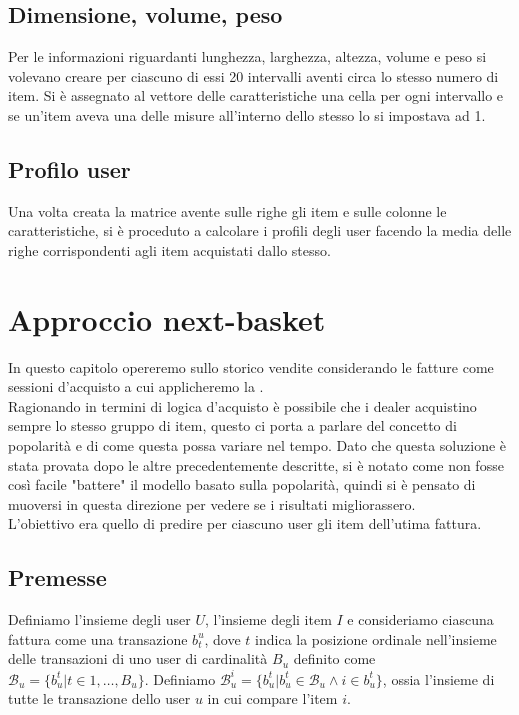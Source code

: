\subsection{Dimensione, volume, peso}
Per le informazioni riguardanti lunghezza, larghezza, altezza, volume e peso si volevano creare per ciascuno di essi 20 intervalli aventi circa lo stesso numero di item. Si è assegnato al vettore delle caratteristiche una cella per ogni intervallo e se un'item aveva una delle misure all'interno dello stesso lo si impostava ad 1.

\subsection{Profilo user}
Una volta creata la matrice avente sulle righe gli item e sulle colonne le caratteristiche, si è proceduto a calcolare i profili degli user facendo la media delle righe corrispondenti agli item acquistati dallo stesso.

\section{Approccio next-basket}
In questo capitolo opereremo sullo storico vendite considerando le fatture come sessioni d'acquisto a cui applicheremo la .\\
Ragionando in termini di logica d'acquisto è possibile che i dealer acquistino sempre lo stesso gruppo di item, questo ci porta a parlare del concetto di popolarità e di come questa possa variare nel tempo.
Dato che questa soluzione è stata provata dopo le altre precedentemente descritte, si è notato come non fosse così facile "battere" il modello basato sulla popolarità, quindi si è pensato di muoversi in questa direzione per vedere se i risultati migliorassero.\\
L'obiettivo era quello di predire per ciascuno user gli item dell'utima fattura.

\subsection{Premesse}
Definiamo l'insieme degli user $U$, l'insieme degli item $I$ e consideriamo ciascuna fattura come una transazione $b_{t}^{u}$, dove $t$ indica la posizione ordinale nell'insieme delle transazioni di uno user di cardinalità $B_{u}$ definito come $\mathcal{B}_u = \{b_{u}^{t} | t \in 1, \dots, B_u\}$. Definiamo $\mathcal{B}_{u}^{i} = \{b_{u}^{t}|b_{u}^{t} \in \mathcal{B}_{u} \wedge i \in b_{u}^{t}\}$, ossia l'insieme di tutte le transazione dello user $u$ in cui compare l'item $i$.
